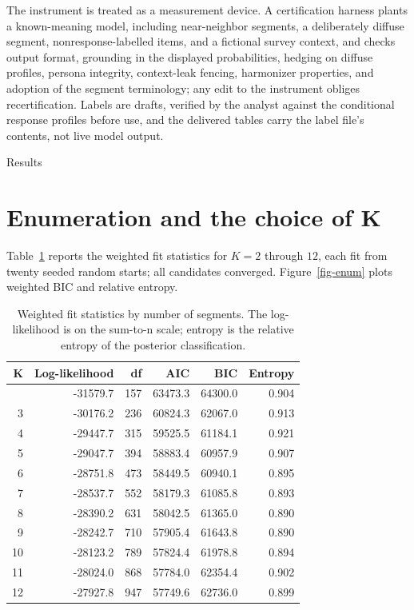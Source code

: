\documentclass[
  12pt]{article}
\begin{document}
The instrument is treated as a measurement device. A certification
harness plants a known-meaning model, including near-neighbor segments,
a deliberately diffuse segment, nonresponse-labelled items, and a
fictional survey context, and checks output format, grounding in the
displayed probabilities, hedging on diffuse profiles, persona integrity,
context-leak fencing, harmonizer properties, and adoption of the segment
terminology; any edit to the instrument obliges recertification. Labels
are drafts, verified by the analyst against the conditional response
profiles before use, and the delivered tables carry the label file's
contents, not live model output.

Results

\section{Enumeration and the choice of K}\label{sec-enumeration}

Table~\ref{tbl-enum} reports the weighted fit statistics for \(K = 2\)
through \(12\), each fit from twenty seeded random starts; all
candidates converged. Figure~\ref{fig-enum} plots weighted BIC and
relative entropy.

\begin{longtable}[]{@{}rrrrrr@{}}

\caption{\label{tbl-enum}Weighted fit statistics by number of segments.
The log-likelihood is on the sum-to-n scale; entropy is the relative
entropy of the posterior classification.}

\tabularnewline

\toprule\noalign{}
K & Log-likelihood & df & AIC & BIC & Entropy \\
\midrule\noalign{}
\endhead
\bottomrule\noalign{}
\endlastfoot
2 & -31579.7 & 157 & 63473.3 & 64300.0 & 0.904 \\
3 & -30176.2 & 236 & 60824.3 & 62067.0 & 0.913 \\
4 & -29447.7 & 315 & 59525.5 & 61184.1 & 0.921 \\
5 & -29047.7 & 394 & 58883.4 & 60957.9 & 0.907 \\
6 & -28751.8 & 473 & 58449.5 & 60940.1 & 0.895 \\
7 & -28537.7 & 552 & 58179.3 & 61085.8 & 0.893 \\
8 & -28390.2 & 631 & 58042.5 & 61365.0 & 0.890 \\
9 & -28242.7 & 710 & 57905.4 & 61643.8 & 0.890 \\
10 & -28123.2 & 789 & 57824.4 & 61978.8 & 0.894 \\
11 & -28024.0 & 868 & 57784.0 & 62354.4 & 0.902 \\
12 & -27927.8 & 947 & 57749.6 & 62736.0 & 0.899 \\

\end{longtable}
\end{document}
